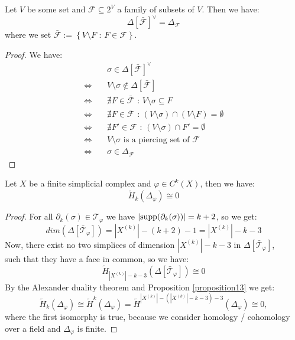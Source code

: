 \begin{prop}\label{proposition13}
Let \(V\) be some set and \(\mathcal{F}\subseteq 2^V\) a family of subsets of \(V\). Then we have:
\[
\Delta\left[\bar{\mathcal{F}}\right]^{\lor}=\Delta_{\mathcal{F}}
\]
where we set \(\bar{\mathcal{F}}:=\left\{V\setminus F\text{ : }F\in\mathcal{F}\right\}\).
\begin{proof}
We have:
\begin{align*}
  & \sigma\in\Delta\left[\bar{\mathcal{F}}\right]^{\lor} \\
  \Longleftrightarrow \quad & V\setminus\sigma\notin\Delta\left[\bar{\mathcal{F}}\right] \\
  \Longleftrightarrow \quad & \nexists F\in\bar{\mathcal{F}}\text{ : }V\setminus\sigma\subseteq F \\
  \Longleftrightarrow \quad & \nexists F\in\bar{\mathcal{F}}\text{ : }(V\setminus\sigma)\cap(V\setminus F)=\emptyset \\
  \Longleftrightarrow \quad & \nexists F'\in\mathcal{F}\text{ : }(V\setminus\sigma)\cap F'=\emptyset \\
  \Longleftrightarrow \quad & V\setminus\sigma\text{ is a piercing set of }\mathcal{F} \\
  \Longleftrightarrow \quad & \sigma\in\Delta_{\mathcal{F}}
 \end{align*}
\end{proof}
\end{prop}

\begin{thm}
Let \(X\) be a finite simplicial complex and \(\varphi\in C^k(X)\), then we have:
\[
\tilde{H}_k(\Delta_{\varphi})\cong 0
\]
\begin{proof}
For all \(\partial_k(\sigma)\in\mathcal{T}_{\varphi}\) we have \(|\mathrm{supp}(\partial_k(\sigma))|=k+2\), so we get:
\[
dim(\Delta[\bar{\mathcal{T}}_{\varphi}])=|X^{(k)}|-(k+2)-1=|X^{(k)}|-k-3
\]
Now, there exist no two simplices of dimension \(|X^{(k)}|-k-3\) in \(\Delta[\bar{\mathcal{T}}_{\varphi}]\),\\
such that they have a face in common, so we have:
\[
\tilde{H}_{|X^{(k)}|-k-3}(\Delta[\bar{\mathcal{T}}_{\varphi}])\cong 0
\]
By the Alexander duality theorem and Proposition \ref{proposition13} we get:
\[
\tilde{H}_k(\Delta_{\varphi})\cong\tilde{H}^k(\Delta_{\varphi})=\tilde{H}^{|X^{(k)}|-(|X^{(k)}|-k-3)-3}(\Delta_{\varphi})\cong 0,
\]
where the first isomorphy is true, because we consider homology / cohomology over a field and \(\Delta_{\varphi}\) is finite.
\end{proof}
\end{thm}

